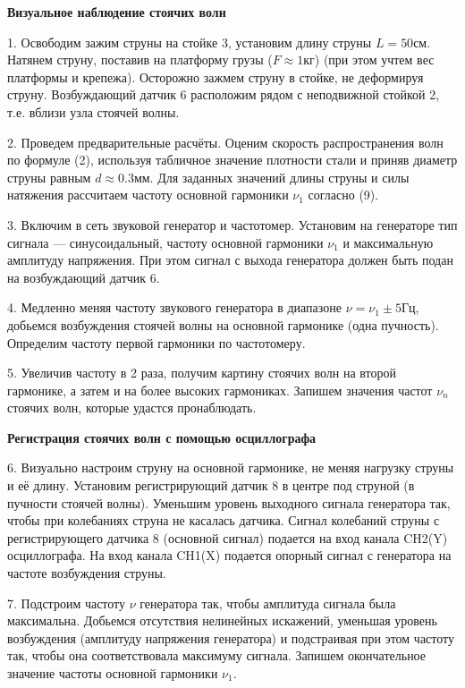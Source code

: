 \documentclass[14pt]{article}
\begin{document}
%
%

\vspace{1cm}
\textbf{Визуальное наблюдение стоячих волн}

1. Освободим зажим струны на стойке 3, установим длину струны $L = 50$см. Натянем струну, поставив на платформу грузы ($F \approx 1$кг) (при этом учтем вес платформы и крепежа). Осторожно зажмем струну в стойке, не деформируя струну. Возбуждающий датчик 6 расположим рядом с неподвижной стойкой 2, т.е. вблизи узла стоячей волны. 

2. Проведем предварительные расчёты. Оценим скорость распространения волн по формуле (2), используя табличное значение плотности стали и приняв диаметр струны равным $d \approx 0.3$мм. Для заданных значений длины струны и силы натяжения рассчитаем частоту основной гармоники $\nu_1$ согласно (9).

3. Включим в сеть звуковой генератор и частотомер. Установим на генераторе тип сигнала --- синусоидальный, частоту основной гармоники $\nu_1$ и максимальную амплитуду напряжения. При этом сигнал с выхода генератора должен быть подан на возбуждающий датчик 6.

4. Медленно меняя частоту звукового генератора в диапазоне $\nu = \nu_1 \pm 5$Гц, добьемся возбуждения стоячей волны на основной гармонике (одна пучность). Определим частоту первой гармоники по частотомеру. 

5. Увеличив частоту в 2 раза, получим картину стоячих волн на второй гармонике, а затем и на более высоких гармониках. Запишем значения частот $\nu_n$ стоячих волн, которые удастся пронаблюдать.

\vspace{1cm}
\textbf{ Регистрация стоячих волн с помощью осциллографа}

6. Визуально настроим струну на основной гармонике, не меняя нагрузку струны и её длину. Установим регистрирующий датчик 8 в центре под струной (в пучности стоячей волны). Уменьшим уровень выходного сигнала генератора так, чтобы при колебаниях струна не касалась датчика. Сигнал колебаний струны с регистрирующего датчика 8 (основной сигнал) подается на вход канала CH2(Y) осциллографа. На вход канала CH1(X) подается опорный сигнал с генератора на частоте возбуждения струны.

7. Подстроим частоту $\nu$ генератора так, чтобы амплитуда сигнала была максимальна. Добьемся отсутствия нелинейных искажений, уменьшая уровень возбуждения (амплитуду напряжения генератора) и подстраивая при этом частоту так, чтобы она соответствовала максимуму сигнала. Запишем окончательное значение частоты основной гармоники $\nu_1$.
\end{document}
